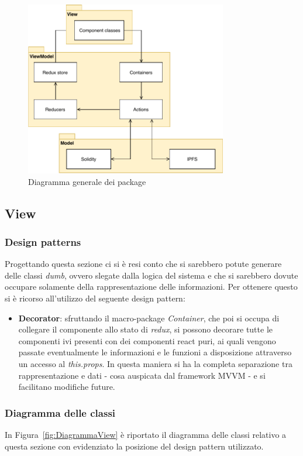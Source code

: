 \begin{figure}[h]
	\centering
	\includegraphics[height=3in]{./Diagrammi/FrameworkPackageGenerale.pdf}
	\caption{Diagramma generale dei package}
	\label{}
\end{figure}

	
	\subsection{View}
		\subsubsection{Design patterns}
		Progettando questa sezione ci si è resi conto che si sarebbero potute generare delle classi \emph{dumb}, ovvero slegate dalla logica del sistema e che si sarebbero dovute occupare solamente della rappresentazione delle informazioni. Per ottenere questo si è ricorso all'utilizzo del seguente design pattern:
			\begin{itemize}
				\item \textbf{Decorator}: sfruttando il macro-package \emph{Container}, che poi si occupa di collegare il componente allo stato di \emph{redux}, si possono decorare tutte le componenti ivi presenti con dei componenti react puri, ai quali vengono passate eventualmente le informazioni e le funzioni a disposizione attraverso un accesso al \emph{this.props}. In questa maniera si ha la completa separazione tra rappresentazione e dati - cosa auspicata dal framework MVVM - e si facilitano modifiche future.
			\end{itemize}
		
		\subsubsection{Diagramma delle classi}
		In Figura~\ref{fig:DiagrammaView} è riportato il diagramma delle classi relativo a questa sezione con evidenziato la posizione del design pattern utilizzato.
	
